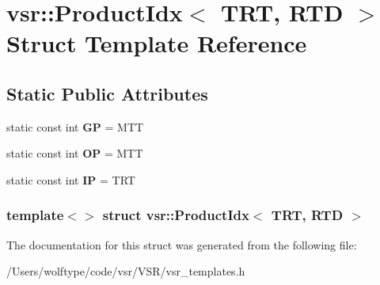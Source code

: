 \hypertarget{structvsr_1_1_product_idx_3_01_t_r_t_00_01_r_t_d_01_4}{\section{vsr\-:\-:Product\-Idx$<$ T\-R\-T, R\-T\-D $>$ Struct Template Reference}
\label{structvsr_1_1_product_idx_3_01_t_r_t_00_01_r_t_d_01_4}
}
\subsection*{Static Public Attributes}
\begin{DoxyCompactItemize}
\item 
\hypertarget{structvsr_1_1_product_idx_3_01_t_r_t_00_01_r_t_d_01_4_a98fe40c2d5363a725924a3151a383d7b}{static const int {\bfseries G\-P} = M\-T\-T}\label{structvsr_1_1_product_idx_3_01_t_r_t_00_01_r_t_d_01_4_a98fe40c2d5363a725924a3151a383d7b}

\item 
\hypertarget{structvsr_1_1_product_idx_3_01_t_r_t_00_01_r_t_d_01_4_a30af697c58b616c834c37158af4fb004}{static const int {\bfseries O\-P} = M\-T\-T}\label{structvsr_1_1_product_idx_3_01_t_r_t_00_01_r_t_d_01_4_a30af697c58b616c834c37158af4fb004}

\item 
\hypertarget{structvsr_1_1_product_idx_3_01_t_r_t_00_01_r_t_d_01_4_a5efa4e528f9e70353121117461fff68f}{static const int {\bfseries I\-P} = T\-R\-T}\label{structvsr_1_1_product_idx_3_01_t_r_t_00_01_r_t_d_01_4_a5efa4e528f9e70353121117461fff68f}

\end{DoxyCompactItemize}
\subsubsection*{template$<$$>$ struct vsr\-::\-Product\-Idx$<$ T\-R\-T, R\-T\-D $>$}



The documentation for this struct was generated from the following file\-:\begin{DoxyCompactItemize}
\item 
/\-Users/wolftype/code/vsr/\-V\-S\-R/vsr\-\_\-templates.\-h\end{DoxyCompactItemize}

